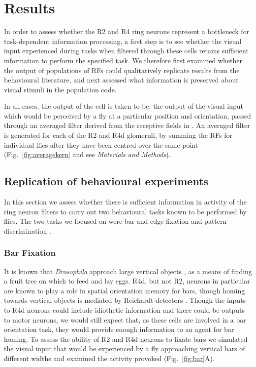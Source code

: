 \section{Results}
In order to assess whether the R2 and R4 ring neurons represent a bottleneck for task-dependent information processing, a first step is to see whether the visual input experienced during tasks when filtered through these cells retains sufficient information to perform the specified task. We therefore first examined whether the output of populations of \acp{RF} could qualitatively replicate results from the behavioural literature, and next assessed what information is preserved about visual stimuli in the population code. 

In all cases, the output of the cell is taken to be: the output of the visual input which would be perceived by a fly at a particular position and orientation, passed through an averaged filter derived from the receptive fields in \cite{Seelig2013}.
An averaged filter is generated for each of the R2 and R4d glomeruli, by summing the \acp{RF} for individual flies after they have been centred over the same point (Fig.~\ref{fig:averagekern} and see \emph{Materials and Methods}).

\subsection{Replication of behavioural experiments}
In this section we assess whether there is sufficient information in activity of the ring neuron filters to carry out two behavioural tasks known to be performed by flies. The two tasks we focused on were bar and edge fixation \cite{Neuser2008,Osorio1990} and pattern discrimination \cite{Pan2009,Liu2006,Ernst1999}.

\subsubsection{Bar Fixation}
It is known that \emph{Drosophila} approach large vertical objects \cite{Reichardt1969}, as a means of finding a fruit tree on which to feed and lay eggs.
R4d, but not R2, neurons in particular are known to play a role in spatial orientation memory for bars, though homing towards vertical objects is mediated by Reichardt detectors \cite{Reichardt1969}.
Though the inputs to R4d neurons could include idiothetic information and there could be outputs to motor neurons, we would still expect that, as these cells are involved in a bar orientation task, they would provide enough information to an agent for bar homing.
To assess the ability of R2 and R4d neurons to fixate bars we simulated the visual input that would be experienced by a fly approaching vertical bars of different widths and examined the activity provoked (Fig.~\ref{fig:bar}A).


